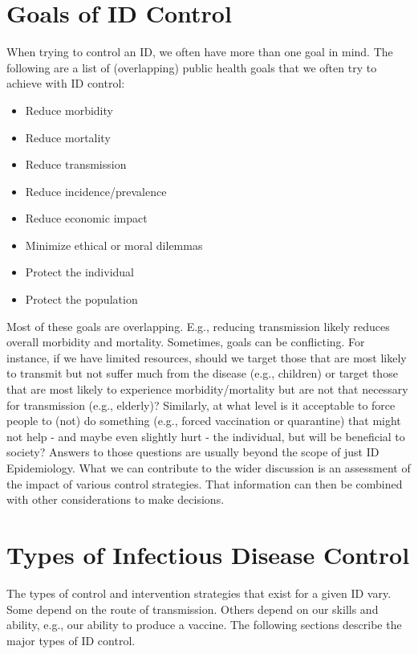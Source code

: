 \documentclass[]{book}
\providecommand{\tightlist}{%
  \setlength{\itemsep}{0pt}\setlength{\parskip}{0pt}}
\theoremstyle{definition}
\theoremstyle{definition}
\theoremstyle{definition}
\theoremstyle{remark}
\begin{document}
\section{Goals of ID Control}\label{goals-of-id-control}

When trying to control an ID, we often have more than one goal in mind.
The following are a list of (overlapping) public health goals that we
often try to achieve with ID control:

\begin{itemize}
\tightlist
\item
  Reduce morbidity
\item
  Reduce mortality
\item
  Reduce transmission
\item
  Reduce incidence/prevalence
\item
  Reduce economic impact
\item
  Minimize ethical or moral dilemmas
\item
  Protect the individual
\item
  Protect the population
\end{itemize}

Most of these goals are overlapping. E.g., reducing transmission likely
reduces overall morbidity and mortality. Sometimes, goals can be
conflicting. For instance, if we have limited resources, should we
target those that are most likely to transmit but not suffer much from
the disease (e.g., children) or target those that are most likely to
experience morbidity/mortality but are not that necessary for
transmission (e.g., elderly)? Similarly, at what level is it acceptable
to force people to (not) do something (e.g., forced vaccination or
quarantine) that might not help - and maybe even slightly hurt - the
individual, but will be beneficial to society? Answers to those
questions are usually beyond the scope of just ID Epidemiology. What we
can contribute to the wider discussion is an assessment of the impact of
various control strategies. That information can then be combined with
other considerations to make decisions.

\section{Types of Infectious Disease
Control}\label{types-of-infectious-disease-control}

The types of control and intervention strategies that exist for a given
ID vary. Some depend on the route of transmission. Others depend on our
skills and ability, e.g., our ability to produce a vaccine. The
following sections describe the major types of ID control.
\end{document}
